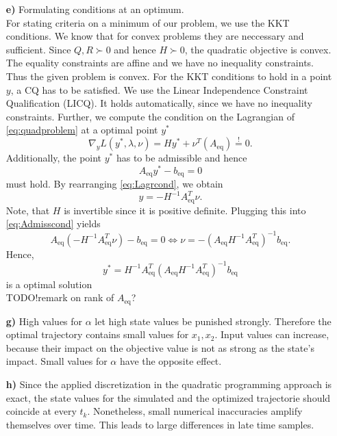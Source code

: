 \documentclass[]{article}
\newcommand{\yopt}{y^*}
\newcommand{\todo}{{\color{red} TODO!}}
\newcommand{\ind}[2]{{#1}_{\mathrm{#2}}}
\newcommand{\trp}{^T}
\newcommand{\xone}{x_1}
\newcommand{\xtwo}{x_2}
\newcommand{\Aeq}{\ind{A}{eq}}
\newcommand{\beq}{\ind{b}{eq}}
\newcommand{\grad}{\nabla}
\newcommand{\inv}{^{-1}}
\begin{document}
\begin{enumerate}
\item[\bf e)] Formulating  conditions at an optimum.\\
For stating criteria on a minimum of our problem, we use the KKT conditions.
We know that for convex problems they are neccessary and sufficient. Since $ Q,R \succ 0$ and hence $ H \succ 0 $, the quadratic objective is convex. The equality constraints are affine and we have no inequality constraints. Thus the given problem is convex. For the KKT conditions to hold in a point $ y$, a CQ has to be satisfied. We use the Linear Independence Constraint Qualification (LICQ).
It holds automatically, since we have no inequality constraints. 
Further, we compute the condition on the Lagrangian of \eqref{eq:quadproblem} at a optimal point $ \yopt $
\begin{equation}
	\grad_y	L(\yopt,\lambda,\nu) = H\yopt + \nu \trp (\Aeq) \overset{!}{=} 0. \label{eq:Lagrcond}
\end{equation}
Additionally, the point $ \yopt $ has to be admissible and hence \begin{equation}
	\Aeq \yopt - \beq = 0 \label{eq:Admisscond}
\end{equation}
must hold.
By rearranging \eqref{eq:Lagrcond}, we obtain
\[ y = - H\inv\Aeq \trp \nu. \] Note, that $ H $ is invertible since it is positive definite.
Plugging this into \eqref{eq:Admisscond} yields
\[  \Aeq (-H\inv \Aeq \trp \nu) -\beq = 0 \Longleftrightarrow \nu = -(\Aeq H\inv \Aeq\trp)\inv \beq.\]
Hence, \[ \yopt = H\inv \Aeq\trp (\Aeq H\inv \Aeq\trp)\inv \beq \] is a optimal solution\\
\todo remark on rank of $ \Aeq $?



\item[\bf g)] High values for $ \alpha $ let high state values be punished strongly. Therefore the optimal trajectory contains small values for $ \xone,\xtwo $.  Input values can increase, because their impact on the objective value is not as strong as the state's impact. Small values for $ \alpha $ have the opposite effect. 

\item[\bf h)] Since the applied discretization in the quadratic programming approach is exact, the state values for the simulated and the optimized trajectorie should coincide at every $ t_k $. Nonetheless, small numerical inaccuracies amplify themselves over time. This leads to large differences in late time samples.




\end{enumerate}
\end{document}
